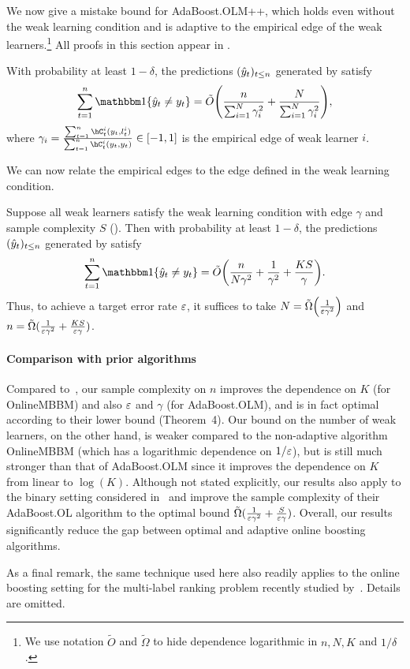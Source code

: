 We now give a mistake bound for AdaBoost.OLM++, which holds even without the weak learning condition and is adaptive to the empirical edge of the weak learners.\footnote{We use notation $\tilde{O}$ and $\tilde{\Omega}$ to hide dependence logarithmic in $n, N, K$ and $1/\delta$.
} All proofs in this section appear in .
\begin{theorem}
\label{thm:multiclass_boosting}
With probability at least $1-\delta$, the predictions $(\hat{y}_t)_{t\leq{}n}$ generated by  satisfy
\begin{equation}
\label{eq:boosting_regret}
\sum_{t=1}^{n}\ind\crl*{\yh_{t}\neq{}y_t} 
= \tilde{O}\prn*{\frac{n}{\sum_{i=1}^{N}\gamma_{i}^{2}}  + \frac{N}{\sum_{i=1}^{N}\gamma_{i}^{2}}},
\end{equation}
where $\gamma_i = \frac{\sum_{t=1}^{n}\hC_{t}^{i}(y_t, l_t^{i})}{\sum_{t=1}^{n}\hC_{t}^{i}(y_t, y_t)} \in [-1, 1]$ is the empirical edge of weak learner $i$.
\end{theorem}

We can now relate the empirical edges to the edge defined in the weak learning condition.
\begin{proposition}
\label{prop:weak_learning_edge}
Suppose all weak learners satisfy the weak learning condition with edge $\gamma$ and sample complexity $S$ (). 
Then with probability at least $1-\delta$, the predictions $(\hat{y}_t)_{t\leq{}n}$ generated by  satisfy
\begin{equation}
\label{eq:boosting_regret_weak}
\sum_{t=1}^{n}\ind\crl*{\yh_{t}\neq{}y_t} 
= \tilde{O}\prn*{\frac{n}{N\gamma^{2}}  + \frac{1}{\gamma^{2}} + \frac{KS}{\gamma}}.
\end{equation}
Thus, to achieve a target error rate $\varepsilon$, it suffices to take $N=\tilde{\Omega}\prn*{\frac{1}{\veps\gamma^{2}}}$ and 
$n = \tilde{\Omega}(\frac{1}{\varepsilon\gamma^{2}} +  \frac{KS}{\varepsilon\gamma})$.
\end{proposition}

\paragraph{Comparison with prior algorithms}
Compared to~\citep{jung2017onlinemulticlass},
our sample complexity on $n$ improves the dependence on $K$ (for OnlineMBBM) and also $\varepsilon$ and $\gamma$ (for AdaBoost.OLM),
and is in fact optimal according to their lower bound (Theorem~4).
Our bound on the number of weak learners, on the other hand, 
is weaker compared to the non-adaptive algorithm OnlineMBBM (which has a logarithmic dependence on $1/\varepsilon$),
but is still much stronger than that of AdaBoost.OLM since it improves the dependence on $K$ from linear to $\log(K)$.
Although not stated explicitly, our results also apply to the binary setting considered in~\citep{beygelzimer2015optimal}
and improve the sample complexity of their AdaBoost.OL algorithm to the optimal bound $\tilde{\Omega}(\frac{1}{\varepsilon\gamma^{2}} +  \frac{S}{\varepsilon\gamma})$.
Overall, our results significantly reduce the gap between optimal and adaptive online boosting algorithms.

As a final remark, the same technique used here also readily applies to the online boosting setting for the multi-label ranking problem
recently studied by~\citet{jung2017online}. Details are omitted.


